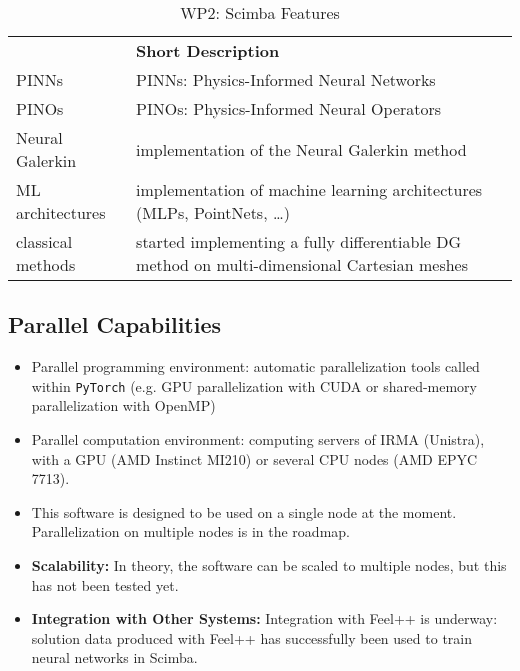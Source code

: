 \begin{table}[h!]
    \centering
    {
        \setlength{\parindent}{0pt}
        \def\arraystretch{1.25}
        {
            \fontsize{9}{11}\selectfont
            \begin{tabular}{!{\color{numpexgray}\vrule}p{.25\linewidth}!{\color{numpexgray}\vrule}p{.6885\linewidth}!{\color{numpexgray}\vrule}}
                 & {\rule{0pt}{2.5ex}\color{white}\bf Short Description } \\
                    PINNs
                 & PINNs: Physics-Informed Neural Networks                \\
                    PINOs
                 & PINOs: Physics-Informed Neural Operators               \\
                    Neural Galerkin
                 & implementation of the Neural Galerkin method           \\
                 ML architectures
                 & implementation of machine learning architectures
                (MLPs, PointNets, \dots)                                  \\
                 classical methods
                 & started implementing a fully differentiable
                DG method on multi-dimensional Cartesian meshes           \\
            \end{tabular}
        }
    }
    \caption{WP2: Scimba Features}
    \label{tab:WP2:Scimba:features}
\end{table}


\subsection{Parallel Capabilities}
\label{sec:WP2:Scimba:performances}

\begin{itemize}
    \item Parallel programming environment:
          automatic parallelization tools called within \texttt{PyTorch}
          (e.g. GPU parallelization with CUDA or shared-memory parallelization with OpenMP)
    \item Parallel computation environment: computing servers of IRMA (Unistra),
          with a GPU (AMD Instinct MI210) or several CPU nodes (AMD EPYC 7713).
    \item This software is designed to be used on a single node at the moment.
          Parallelization on multiple nodes is in the roadmap.
    \item \textbf{Scalability:}
          In theory, the software can be scaled to multiple nodes, but this has not been tested yet.
    \item \textbf{Integration with Other Systems:}
          Integration with Feel++ is underway:
          solution data produced with Feel++ has successfully been
          used to train neural networks in Scimba.
\end{itemize}


